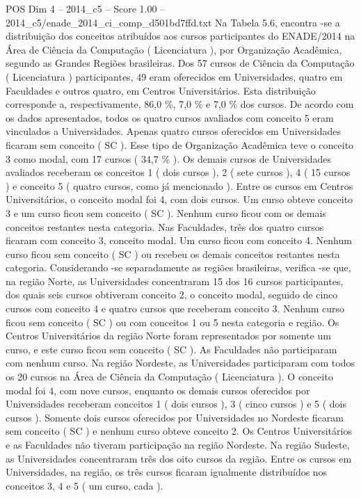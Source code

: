 \begin{textsample}{POS Dim 4 – 2014\_c5 – Score 1.00 – 2014\_c5/enade\_2014\_ci\_comp\_d501bd7ffd.txt}
Na Tabela 5.6, encontra -se a distribuição dos conceitos atribuídos aos cursos participantes do ENADE/2014 na Área de Ciência da Computação ( Licenciatura ), por Organização Acadêmica, segundo as Grandes Regiões brasileiras.
Dos 57 cursos de Ciência da Computação ( Licenciatura ) participantes, 49 eram oferecidos em Universidades, quatro em Faculdades e outros quatro, em Centros Universitários.
Esta distribuição corresponde a, respectivamente, 86,0 \%, 7,0 \% e 7,0 \% dos cursos.
De acordo com os dados apresentados, todos os quatro cursos avaliados com conceito 5 eram vinculados a Universidades.
Apenas quatro cursos oferecidos em Universidades ficaram sem conceito ( SC ).
Esse tipo de Organização Acadêmica teve o conceito 3 como modal, com 17 cursos ( 34,7 \% ).
Os demais cursos de Universidades avaliados receberam os conceitos 1 ( dois cursos ), 2 ( sete cursos ), 4 ( 15 cursos ) e conceito 5 ( quatro cursos, como já mencionado ).
Entre os cursos em Centros Universitários, o conceito modal foi 4, com dois cursos.
Um curso obteve conceito 3 e um curso ficou sem conceito ( SC ).
Nenhum curso ficou com os demais conceitos restantes nesta categoria.
Nas Faculdades, três dos quatro cursos ficaram com conceito 3, conceito modal.
Um curso ficou com conceito 4.
Nenhum curso ficou sem conceito ( SC ) ou recebeu os demais conceitos restantes nesta categoria.
Considerando -se separadamente as regiões brasileiras, verifica -se que, na região Norte, as Universidades concentraram 15 dos 16 cursos participantes, dos quais seis cursos obtiveram conceito 2, o conceito modal, seguido de cinco cursos com conceito 4 e quatro cursos que receberam conceito 3.
Nenhum curso ficou sem conceito ( SC ) ou com conceitos 1 ou 5 nesta categoria e região.
Os Centros Universitários da região Norte foram representados por somente um curso, e este curso ficou sem conceito ( SC ).
As Faculdades não participaram com nenhum curso.
Na região Nordeste, as Universidades participaram com todos os 20 cursos na Área de Ciência da Computação ( Licenciatura ).
O conceito modal foi 4, com nove cursos, enquanto os demais cursos oferecidos por Universidades receberam conceitos 1 ( dois cursos ), 3 ( cinco cursos ) e 5 ( dois cursos ).
Somente dois cursos oferecidos por Universidades no Nordeste ficaram sem conceito ( SC ) e nenhum curso obteve conceito 2.
Os Centros Universitários e as Faculdades não tiveram participação na região Nordeste.
Na região Sudeste, as Universidades concentraram três dos oito cursos da região.
Entre os cursos em Universidades, na região, os três cursos ficaram igualmente distribuídos nos conceitos 3, 4 e 5 ( um curso, cada ).

\end{textsample}
